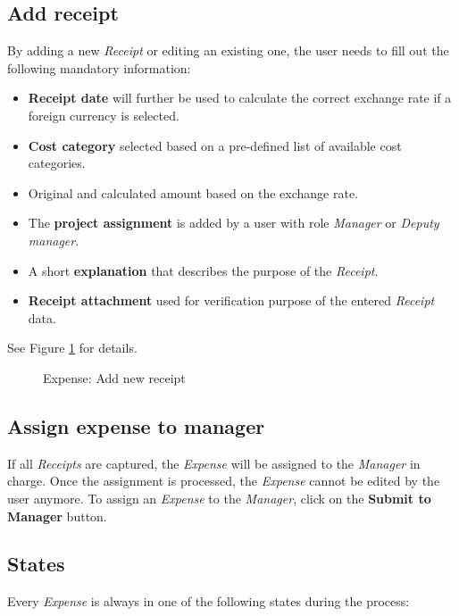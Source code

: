 \subsection{Add receipt}
\label{sec:addreceipt}
By adding a new \textit{Receipt} or editing an existing one, the user needs to fill out the following mandatory information:
\begin{itemize}
    \item \textbf{Receipt date} will further be used to calculate the correct exchange rate if a foreign currency is selected.
    \item \textbf{Cost category} selected based on a pre-defined list of available cost categories.
    \item Original and calculated amount based on the exchange rate.
    \item The \textbf{project assignment} is added by a user with role \textit{Manager} or \textit{Deputy manager}.
    \item A short \textbf{explanation} that describes the purpose of the \textit{Receipt}.
    \item \textbf{Receipt attachment} used for verification purpose of the entered \textit{Receipt} data.
\end{itemize}

See Figure \ref{fig:expenses-add01} for details.


\begin{figure}[H]
    \centering
    \caption{Expense: Add new receipt}
    \label{fig:expenses-add01}
\end{figure}

\subsection{Assign expense to manager}
If all \textit{Receipts} are captured, the \textit{Expense} will be assigned to the \textit{Manager} in charge. Once the assignment is processed, the \textit{Expense} cannot be edited by the user anymore. To assign an \textit{Expense} to the \textit{Manager}, click on the \textbf{Submit to Manager} button.

\subsection{States}
\label{sec:states}
Every \textit{Expense} is always in one of the following states during the process:

